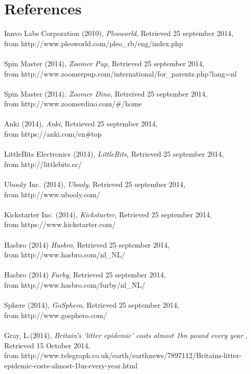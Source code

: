\documentclass[11pt,twoside,a4paper]{report}
\begin{document}
\chapter{References}
Innvo Labs Corporation (2010), \textit{Pleoworld}, Retrieved 25 september 2014, \\from http://www.pleoworld.com/pleo\_rb/eng/index.php \\
\\
Spin Master (2014), \textit{Zoomer Pup}, Retrieved 25 september 2014, \\from http://www.zoomerpup.com/international/for\_parents.php?lang=nl\\
\\
Spin Master (2014), \textit{Zoomer Dino}, Retreived 25 september 2014, \\from http://www.zoomerdino.com/\#/home\\
\\
Anki (2014), \textit{Anki}, Retrieved 25 september 2014, \\from https://anki.com/en\#top \\
\\
LittleBits Electronics (2014), \textit{LittleBits}, Retrieved 25 september 2014,\\ from http://littlebits.cc/ \\
\\
Ubooly Inc. (2014), \textit{Ubooly}, Retrieved 25 september 2014,\\ from http://www.ubooly.com/ \\
\\
Kickstarter Inc. (2014), \textit{Kickstarter}, Retrieved 25 september 2014, \\from https://www.kickstarter.com/ \\
\\
Hasbro (2014) \textit{Hasbro}, Retrieved 25 september 2014, \\from http://www.hasbro.com/nl\_NL/ \\
\\
Hasbro (2014) \textit{Furby}, Retrieved 25 september 2014, \\from http://www.hasbro.com/furby/nl\_NL/ \\
\\
Sphere (2014), \textit{GoSphero}, Retrieved 25 september 2014,\\ from http://www.gosphero.com/ \\
\\
Gray, L.(2014), \textit{Britain\rq{}s \lq{}litter epidemic\rq{} costs almost 1bn pound every year} , Retrieved 15 October 2014, \\from http://www.telegraph.co.uk/earth/earthnews/7897112/Britains-litter-epidemic-costs-almost-1bn-every-year.html \\
\end{document}
